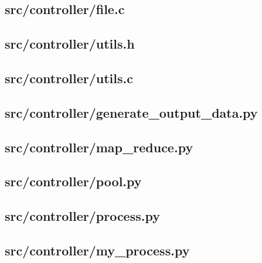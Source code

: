 \subsection{src/controller/file.c}
	
	\newpage

\subsection{src/controller/utils.h}
	
	\newpage

\subsection{src/controller/utils.c}
	
	\newpage

\subsection{src/controller/generate\_output\_data.py}
	
	\newpage

\subsection{src/controller/map\_reduce.py}
	
	\newpage

\subsection{src/controller/pool.py}
	
	\newpage

\subsection{src/controller/process.py}
	
	\newpage

\subsection{src/controller/my\_process.py}
	
	\newpage

